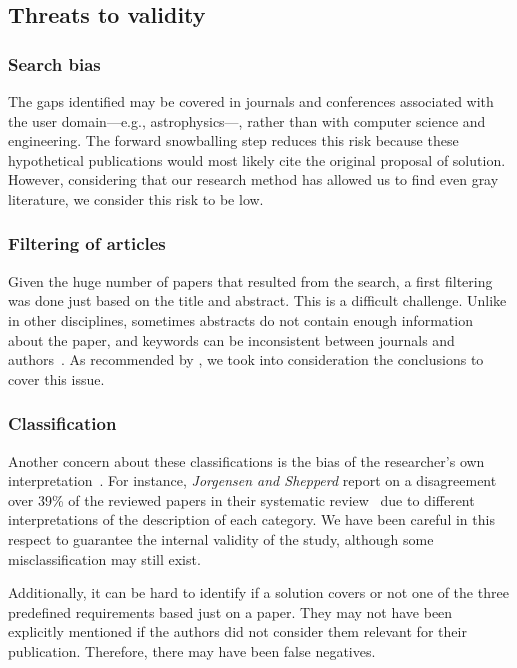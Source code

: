 \subsection{Threats to validity}
\label{sec:mapping/threats}
\subsubsection{Search bias}
The gaps identified may be covered in
journals and conferences associated with the user domain---e.g., astrophysics---,
rather than with computer science and engineering. The forward snowballing
step reduces this risk because these hypothetical publications would most likely
cite the original proposal of solution. However, considering that our research method has
allowed us to find even gray literature, we consider this risk to be low.

\subsubsection{Filtering of articles}
Given the huge number of papers that resulted from the search,
a first filtering was done just based on the title and abstract.
This is a difficult challenge. Unlike in other disciplines, sometimes abstracts
do not contain enough information about the paper, and keywords can be inconsistent
between journals and authors~\cite{Budgen2008,Brereton2007,Jalali2012}.
As recommended by \cite{Brereton2007}, we took into consideration
the conclusions to cover this issue.

\subsubsection{Classification}
Another concern about these classifications is the bias of the researcher's own
interpretation~\cite{MacLure2005}.
For instance, \emph{Jorgensen and Shepperd} report on a disagreement over
39\% of the reviewed papers in their systematic review~\cite{Jorgensen2007}
due to different interpretations of the description of each category. We
have been careful in this respect to guarantee the internal validity of the
study, although some misclassification may still exist.

Additionally, it can be hard to identify if a solution covers or not one of the
three predefined requirements based just on a paper. They may not have been
explicitly mentioned if the authors did not consider them relevant for their publication. Therefore, there may have been false negatives.

